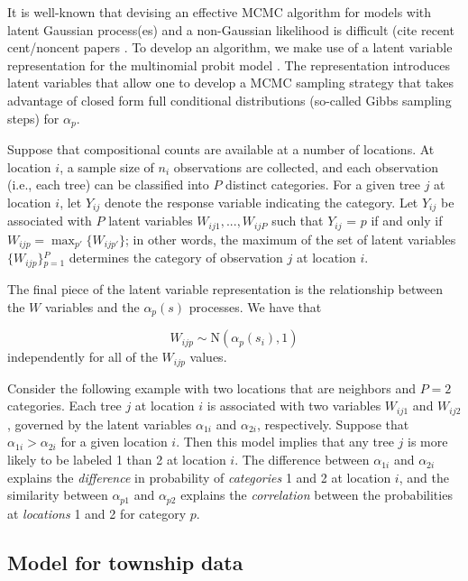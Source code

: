 \documentclass[12pt]{article}\usepackage[]{graphicx}\usepackage[]{color}
\begin{document}
It is well-known that devising an effective MCMC algorithm for models
with latent Gaussian process(es) and a non-Gaussian likelihood is
difficult (cite recent cent/noncent papers \citep{Rue:Held:2005,Chri:etal:2006,Tan:Nott:2013}.
To develop an algorithm, we make use of a latent variable representation
for the multinomial probit model \citep{McCu:Ross:1994}. The representation
introduces latent variables that allow one to develop a MCMC sampling
strategy that takes advantage of closed form full conditional distributions
(so-called Gibbs sampling steps) for $\alpha_{p}$.

Suppose that compositional counts are available at a number of locations.
At location $i$, a sample size of $n_{i}$ observations are collected,
and each observation (i.e., each tree) can be classified into $P$
distinct categories. For a given tree $j$ at location $i$, let $Y_{ij}$
denote the response variable indicating the category. Let $Y_{ij}$
be associated with $P$ latent variables $W_{ij1},...,W_{ijP}$ such
that $Y_{ij}$ = $p$ if and only if $W_{ijp}={\displaystyle \max_{p'}\big\{ W_{ijp'}\big\}}$;
in other words, the maximum of the set of latent variables $\{W_{ijp}\}{\displaystyle _{p=1}^{P}}$
determines the category of observation $j$ at location $i$. 



\noindent The final piece of the latent variable representation is
the relationship between the $W$ variables and the $\alpha_{p}(s)$
processes. We have that

\noindent 
\[
W_{ijp}\sim\mbox{N}(\alpha_{p}(s_{i}),1)
\]
independently for all of the $W_{ijp}$ values. 

\noindent Consider the following example with two locations that are
neighbors and $P=2$ categories. Each tree $j$ at location $i$ is
associated with two variables $W_{ij1}$ and $W_{ij2}$, governed
by the latent variables $\alpha_{1i}$ and $\alpha_{2i}$, respectively.
Suppose that $\alpha_{1i}>\alpha_{2i}$ for a given location $i$.
Then this model implies that any tree $j$ is more likely to be labeled
1 than 2 at location $i$. The difference between $\alpha_{1i}$ and
$\alpha_{2i}$ explains the \textit{difference} in probability of
\textit{categories} 1 and 2 at location $i$, and the similarity between
$\alpha_{p1}$ and $\alpha_{p2}$ explains the \textit{correlation}
between the probabilities at \textit{locations} 1 and 2 for category
$p$.


\subsection{Model for township data\label{sub:Model-for-township}}
\end{document}
